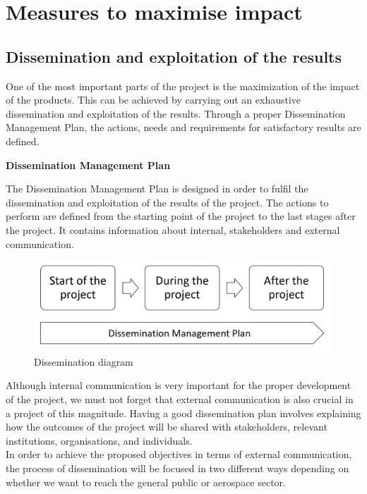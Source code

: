 \section{Measures to maximise impact}

\subsection{Dissemination and exploitation of the results}

One of the most important parts of the project is the maximization of the impact of the products. This can be achieved by carrying out an exhaustive dissemination and exploitation of the results. Through a proper Dissemination Management Plan, the actions, needs and requirements for satisfactory results are defined. 

\textbf{Dissemination Management Plan}

The Dissemination Management Plan is designed in order to fulfil the dissemination and exploitation of the results of the project. The actions to perform are defined from the starting point of the project to the last stages after the project. It contains information about internal, stakeholders and external communication.

\begin{figure}[H]
	\centering
	\includegraphics[width=\textwidth]{images/dissemination.png}
	\caption{Dissemination diagram} 
	\label{dissemination}
\end{figure}

Although internal communication is very important for the proper development of the project, we must not forget that external communication is also crucial in a project of this magnitude. Having a good dissemination plan involves explaining how the outcomes of the project will be shared with stakeholders, relevant institutions, organisations, and individuals. \\
In order to achieve the proposed objectives in terms of external communication, the process of dissemination will be focused  in two different ways depending on whether we want to reach the general public or aerospace sector.

